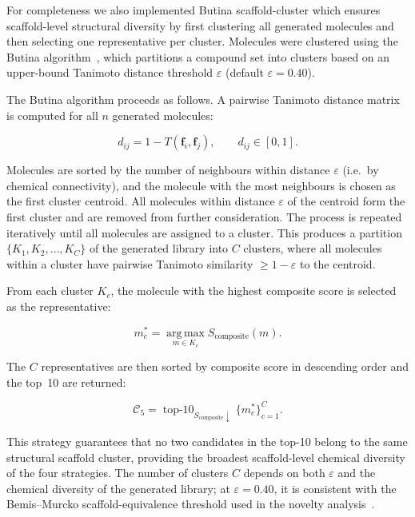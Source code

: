 \documentclass[a4paper,12pt]{article}
\begin{document}
For completeness we also implemented Butina scaffold-cluster which ensures scaffold-level structural diversity by first
clustering all generated molecules and then selecting one
representative per cluster.
Molecules were clustered using the Butina
algorithm~\cite{butina1999}, which partitions a compound set into
clusters based on an upper-bound Tanimoto distance threshold
$\varepsilon$ (default $\varepsilon = 0.40$).
 
The Butina algorithm proceeds as follows.
A pairwise Tanimoto distance matrix is computed for all $n$
generated molecules:
 
\begin{equation}
    d_{ij} = 1 - T(\mathbf{f}_i, \mathbf{f}_j),
    \qquad d_{ij} \in [0, 1].
    \label{eq:tanimoto_distance}
\end{equation}
 
\noindent Molecules are sorted by the number of neighbours within
distance $\varepsilon$ (i.e.\ by chemical connectivity), and the
molecule with the most neighbours is chosen as the first cluster
centroid.
All molecules within distance $\varepsilon$ of the centroid form
the first cluster and are removed from further consideration.
The process is repeated iteratively until all molecules are
assigned to a cluster.
This produces a partition $\{K_1, K_2, \ldots, K_C\}$ of the
generated library into $C$ clusters, where all molecules within
a cluster have pairwise Tanimoto similarity $\geq 1 - \varepsilon$
to the centroid.
 
From each cluster $K_c$, the molecule with the highest composite
score is selected as the representative:
 
\begin{equation}
    m^{*}_c
    = \operatorname*{arg\,max}_{m \in K_c}
      S_{\mathrm{composite}}(m).
    \label{eq:cluster_rep}
\end{equation}
 
\noindent The $C$ representatives are then sorted by composite
score in descending order and the top~10 are returned:
 
\begin{equation}
    \mathcal{C}_5
    = \operatorname{top\text{-}10}_{S_{\mathrm{composite}}\downarrow}
      \bigl\{ m^{*}_c \bigr\}_{c=1}^{C}.
    \label{eq:idea5}
\end{equation}
 
\noindent This strategy guarantees that no two candidates in the
top-10 belong to the same structural scaffold cluster, providing
the broadest scaffold-level chemical diversity of the four
strategies.
The number of clusters $C$ depends on both $\varepsilon$ and the
chemical diversity of the generated library; at $\varepsilon = 0.40$,
it is consistent with the Bemis--Murcko scaffold-equivalence
threshold used in the novelty analysis~\cite{bemis1996scaffolds}.
\end{document}
